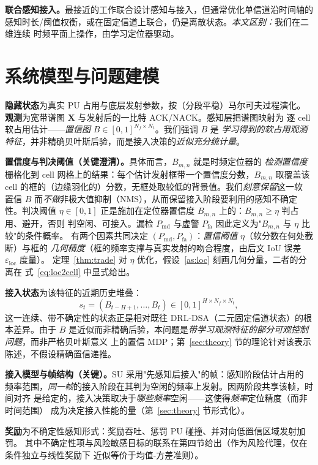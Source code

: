 \documentclass[11pt,a4paper]{article}
\newcommand{\hei}[1]{{\cjkhei #1}}
\theoremstyle{plain}
\theoremstyle{definition}
\newcommand{\Pmd}{P_{\mathrm{md}}}
\newcommand{\Pfa}{P_{\mathrm{fa}}}
\newcommand{\thr}{\eta}
\newcommand{\eloc}{\varepsilon_{\mathrm{loc}}}
\newcommand{\spec}{\mathbf{X}}
\begin{document}
\textbf{\hei{联合感知接入。}}最接近的工作联合设计感知与接入，但通常优化单信道沿时间轴的
感知时长/阈值权衡，或在固定信道上联合，仍是离散状态。\emph{本文区别：}我们在二维连续
时频平面上操作，由学习定位器驱动。

\section{系统模型与问题建模}

\textbf{\hei{隐藏状态}}为真实 PU 占用与底层发射参数，按（分段平稳）马尔可夫过程演化。
\textbf{\hei{观测}}为宽带谱图 $\spec$ 与发射后的一比特 ACK/NACK。感知层把谱图映射为
逐 cell 软占用估计——\emph{置信图} $B\in[0,1]^{N_f\times N_t}$。我们强调 $B$ 是
\emph{学习得到的软占用观测特征}，并非精确贝叶斯后验，而是接入决策的\emph{近似充分统计量}。

\textbf{\hei{置信度与判决阈值（关键澄清）。}}具体而言，$B_{m,n}$ 就是时频定位器的
\emph{检测置信度}栅格化到 cell 网格上的结果：每个估计发射框带一个置信度分数，$B_{m,n}$
取覆盖该 cell 的框的（边缘羽化的）分数，无框处取较低的背景值。我们\emph{刻意保留}这一软
置信 $B$ 而\emph{不做}非极大值抑制（NMS），从而保留接入阶段要利用的感知不确定性。判决阈值
$\thr\in[0,1]$ 正是施加在定位器置信度 $B_{m,n}$ 上的：$B_{m,n}\ge\thr$ 判占用、避开，否则
判空闲、可接入。漏检 $\Pmd$ 与虚警 $\Pfa$ 因此定义为"$B_{m,n}$ 与 $\thr$ 比较"的条件概率。
有两个因素共同决定 $(\Pmd,\Pfa)$：\emph{置信阈值} $\thr$（软分数在何处截断）与框的
\emph{几何精度}（框的频率支撑与真实发射的吻合程度，由后文 IoU 误差 $\eloc$ 度量）。
定理~\ref{thm:trade} 对 $\thr$ 优化，假设~\ref{as:loc} 刻画几何分量，二者的分离在
式~\eqref{eq:loc2cell} 中显式给出。

\textbf{\hei{接入状态}}为该特征的近期历史堆叠：
\[
s_t=(B_{t-H+1},\dots,B_t)\in[0,1]^{H\times N_f\times N_t},
\]
这一连续、带不确定性的状态正是相对既往 DRL-DSA（二元固定信道状态）的根本差异。由于 $B$
是近似而非精确后验，本问题是\emph{带学习观测特征的部分可观控制问题}，而非严格贝叶斯意义
上的置信 MDP；第~\ref{sec:theory} 节的理论针对该表示陈述，不假设精确置信递推。

\textbf{\hei{接入模型与帧结构（关键）。}}SU 采用"先感知后接入"的帧：感知阶段估计占用的
频率范围，\emph{同一帧}的接入阶段在其判为空闲的频率上发射。因两阶段共享该帧，时间对齐
是给定的，接入决策取决于\emph{哪些频率}空闲——这使得\emph{频率}定位精度（而非时间范围）
成为决定接入性能的量（第~\ref{sec:theory} 节形式化）。

\textbf{\hei{奖励}}为不确定性感知形式：奖励吞吐、惩罚 PU 碰撞、并对向低置信区域发射加罚。
其中不确定性项与风险敏感目标的联系在第四节给出（作为风险代理，仅在条件独立与线性奖励下
近似等价于均值-方差准则）。
\end{document}
